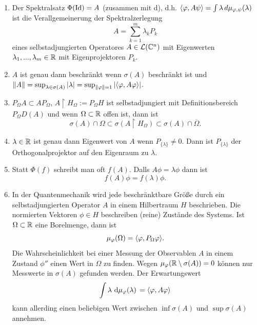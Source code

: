 \documentclass{mycourse}
\begin{document}
\begin{nt*}
\begin{enumerate}[1)]
\item Der Spektralsatz $\Phi(\Id)=A$ (zusammen mit d), d.h. $\< \phi, A\psi\> = \int \lambda \, d\mu_{\phi, \psi}(\lambda)$ ist die Verallgemeinerung der Spektralzerlegung
\[
	A= \sum_{k=1}^m \lambda_k P_k
\]
eines selbstadjungierten Operatores $A\in \mathcal L(\C^n)$ mit Eigenwerten $\lambda_1,...,\lambda_m \in \R$ mit Eigenprojektoren $P_k$.
\item $A$ ist genau dann beschränkt wenn $\sigma(A)$ beschränkt ist und $\| A \| = \sup_{\lambda \in \sigma(A)} | \lambda | = \sup_{\| \phi \| = 1} | \< \phi, A\phi\>|$.
\item $P_\Omega A\subset A P_\Omega$, $A\upharpoonright H_\Omega := P_\Omega H$ ist selbstadjungiert mit Definitionsbereich $P_\Omega D(A)$ und wenn $\Omega \subset \R$ offen ist, dann ist 
\[
	\sigma(A) \cap \Omega \subset \sigma(A \upharpoonright H_\Omega) \subset \sigma(A) \cap \overline{\Omega}.
\]
\item $\lambda \in \R$ ist genau dann Eigenwert von $A$ wenn $P_{\{\lambda\}} \neq 0$. Dann ist $P_{\{\lambda\}}$ der Orthogonalprojektor auf den Eigenraum zu $\lambda$.
\item Statt $\Phi(f)$ schreibt man oft $f(A)$. Dalls $A\phi= \lambda \phi$ dann ist
\[
f(A) \phi = f(\lambda) \phi.
\]
\item In der Quantenmechanik wird jede beschränktbare Größe durch ein selbstadjungierten Operator $A$ in einem Hilbertraum $H$ beschrieben. Die normierten Vektoren $\phi \in H$ beschreiben (reine) Zustände des Systems. Ist $\Omega \subset \R$ eine Borelmenge, dann ist
\[
\mu_\phi(\Omega) = \< \phi, P_\Omega \phi \>.
\]
Die Wahrscheinlichkeit bei einer Messung der Observablen $A$ in einem Zustand $\phi''$ einen Wert in $\Omega$ zu finden. Wegen $\mu_\phi(\R\setminus \sigma(A))=0$ können nur Messwerte in $\sigma(A)$ gefunden werden. Der Erwartungswert
\[
\int \lambda \, \dx[\mu_\phi(\lambda)] = \< \phi, A\phi\>
\]
kann allerding einen beliebigen Wert zwischen $\inf\sigma(A)$ und $\sup \sigma(A)$ annehmen.
\end{enumerate}
\end{nt*}
\end{document}
